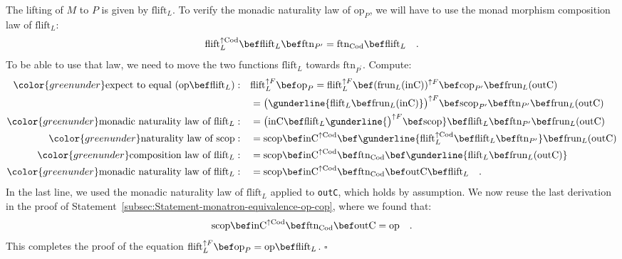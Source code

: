 The lifting of $M$ to $P$ is given by $\text{flift}_{L}$. To verify
the monadic naturality law of $\text{op}_{P}$, we will have to use
the monad morphism composition law of $\text{flift}_{L}$:
\[
\text{flift}_{L}^{\uparrow\text{Cod}}\bef\text{flift}_{L}\bef\text{ftn}_{P^{\prime}}=\text{ftn}_{\text{Cod}}\bef\text{flift}_{L}\quad.
\]
To be able to use that law, we need to move the two functions $\text{flift}_{L}$
towards $\text{ftn}_{P^{\prime}}$. Compute:
\begin{align*}
{\color{greenunder}\text{expect to equal }(\text{op}\bef\text{flift}_{L}):}\quad & \text{flift}_{L}^{\uparrow F}\bef\text{op}_{P}=\text{flift}_{L}^{\uparrow F}\bef(\text{frun}_{L}(\text{inC}))^{\uparrow F}\bef\text{cop}_{P^{\prime}}\bef\text{frun}_{L}(\text{outC})\\
 & =\big(\gunderline{\text{flift}_{L}\bef\text{frun}_{L}(\text{inC})}\big)^{\uparrow F}\bef\text{scop}_{P^{\prime}}\bef\text{ftn}_{P^{\prime}}\bef\text{frun}_{L}(\text{outC})\\
{\color{greenunder}\text{monadic naturality law of }\text{flift}_{L}:}\quad & =\big(\text{inC}\bef\text{flift}_{L}\gunderline{\big)^{\uparrow F}\bef\text{scop}}\bef\text{flift}_{L}\bef\text{ftn}_{P^{\prime}}\bef\text{frun}_{L}(\text{outC})\\
{\color{greenunder}\text{naturality law of }\text{scop}:}\quad & =\text{scop}\bef\text{inC}^{\uparrow\text{Cod}}\bef\gunderline{\text{flift}_{L}^{\uparrow\text{Cod}}\bef\text{flift}_{L}\bef\text{ftn}_{P^{\prime}}}\bef\text{frun}_{L}(\text{outC})\\
{\color{greenunder}\text{composition law of }\text{flift}_{L}:}\quad & =\text{scop}\bef\text{inC}^{\uparrow\text{Cod}}\bef\text{ftn}_{\text{Cod}}\bef\gunderline{\text{flift}_{L}\bef\text{frun}_{L}(\text{outC})}\\
{\color{greenunder}\text{monadic naturality law of }\text{flift}_{L}:}\quad & =\text{scop}\bef\text{inC}^{\uparrow\text{Cod}}\bef\text{ftn}_{\text{Cod}}\bef\text{outC}\bef\text{flift}_{L}\quad.
\end{align*}
In the last line, we used the monadic naturality law of $\text{flift}_{L}$
applied to \lstinline!outC!, which holds by assumption. We now reuse
the last derivation in the proof of Statement~\ref{subsec:Statement-monatron-equivalence-op-cop},
where we found that:
\[
\text{scop}\bef\text{inC}^{\uparrow\text{Cod}}\bef\text{ftn}_{\text{Cod}}\bef\text{outC}=\text{op}\quad.
\]
This completes the proof of the equation $\text{flift}_{L}^{\uparrow F}\bef\text{op}_{P}=\text{op}\bef\text{flift}_{L}$.
$\square$

